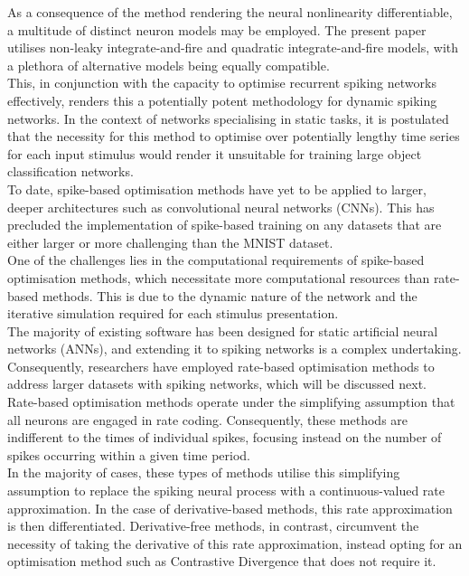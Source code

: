 \noindent As a consequence of the method rendering the neural nonlinearity differentiable, a multitude of distinct neuron models may be employed. The present paper utilises non-leaky integrate-and-fire and quadratic integrate-and-fire models, with a plethora of alternative models being equally compatible. \\

\noindent This, in conjunction with the capacity to optimise recurrent spiking networks effectively, renders this a potentially potent methodology for dynamic spiking networks. In the context of networks specialising in static tasks, it is postulated that the necessity for this method to optimise over potentially lengthy time series for each input stimulus would render it unsuitable for training large object classification networks. \\

\noindent To date, spike-based optimisation methods have yet to be applied to larger, deeper architectures such as convolutional neural networks (CNNs). This has precluded the implementation of spike-based training on any datasets that are either larger or more challenging than the MNIST dataset. \\

\noindent One of the challenges lies in the computational requirements of spike-based optimisation methods, which necessitate more computational resources than rate-based methods. This is due to the dynamic nature of the network and the iterative simulation required for each stimulus presentation. \\

\noindent The majority of existing software has been designed for static artificial neural networks (ANNs), and extending it to spiking networks is a complex undertaking. Consequently, researchers have employed rate-based optimisation methods to address larger datasets with spiking networks, which will be discussed next. \\

\noindent Rate-based optimisation methods operate under the simplifying assumption that all neurons are engaged in rate coding. Consequently, these methods are indifferent to the times of individual spikes, focusing instead on the number of spikes occurring within a given time period. \\

\noindent In the majority of cases, these types of methods utilise this simplifying assumption to replace the spiking neural process with a continuous-valued rate approximation. In the case of derivative-based methods, this rate approximation is then differentiated. Derivative-free methods, in contrast, circumvent the necessity of taking the derivative of this rate approximation, instead opting for an optimisation method such as Contrastive Divergence that does not require it. \\

